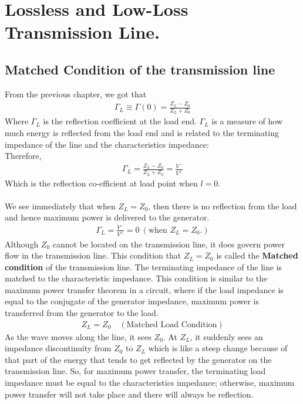 \chapter{Lossless and Low-Loss Transmission Line.}
\section{Matched Condition of the transmission line}
From the previous chapter, we got that
\begin{align*}
\Gamma_L \equiv \Gamma{(0)} = \frac{Z_L - Z_0}{Z_L + Z_0}
\end{align*}
Where $\Gamma_L$ is the reflection coefficient at the load end. $\Gamma_L$ is a measure of how much energy is reflected from the load end and is related to the terminating impedance of the line and the characteristics impedance:\\

Therefore, 
\begin{align*}
\Gamma_L = \frac{Z_L - Z_0}{Z_L + Z_0} =  \frac{V^-}{V^+}
\end{align*}
Which is the reflection co-efficient at load point when $l = 0$.\\\\
We see immediately that when  $Z_L = Z_0$, then there is no reflection from the load and hence maximum power is delivered to the generator.
\begin{align*}
\Gamma_L = \frac{V^-}{V^+} = 0\ (\text{when }Z_L = Z_0.) 
\end{align*}
Although $Z_0$ cannot be located on the transmission line, it does govern power flow in the transmission line. This condition that $Z_L = Z_0$ is called the \textbf{Matched condition} of the transmission line. The terminating impedance of the line is matched to the characteristic impedance. This condition is similar to the maximum power transfer theorem in a circuit, where if the load impedance is equal to the conjugate of the generator impedance, maximum power is transferred from the generator to the load. 
\begin{align*}
Z_L = Z_0 \quad (\text{Matched Load Condition})
\end{align*}
As the wave moves along the line, it sees $Z_0$. At $Z_L$, it suddenly sees an impedance discontinuity from $Z_0$ to $Z_L$ which is like a steep change because of that part of the energy that tends to get reflected by the generator on the transmission line. So, for maximum power transfer, the terminating load impedance must be equal to the characteristics impedance; otherwise, maximum power transfer will not take place and there will always be reflection.\\

